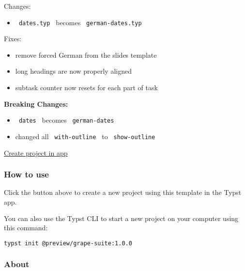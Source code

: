 Changes:

\begin{itemize}
\tightlist
\item
  \texttt{\ dates.typ\ } becomes \texttt{\ german-dates.typ\ }
\end{itemize}

Fixes:

\begin{itemize}
\tightlist
\item
  remove forced German from the slides template
\item
  long headings are now properly aligned
\item
  subtask counter now resets for each part of task
\end{itemize}

\textbf{Breaking Changes:}

\begin{itemize}
\tightlist
\item
  \texttt{\ dates\ } becomes \texttt{\ german-dates\ }
\item
  changed all \texttt{\ with-outline\ } to \texttt{\ show-outline\ }
\end{itemize}

\href{/app?template=grape-suite&version=1.0.0}{Create project in app}

\subsubsection{How to use}\label{how-to-use}

Click the button above to create a new project using this template in
the Typst app.

You can also use the Typst CLI to start a new project on your computer
using this command:

\begin{verbatim}
typst init @preview/grape-suite:1.0.0
\end{verbatim}



\subsubsection{About}\label{about}

